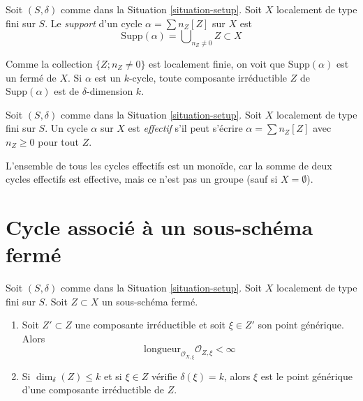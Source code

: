 \begin{definition}
\label{definition-support-cycle}
Soit $(S, \delta)$ comme dans la Situation \ref{situation-setup}.
Soit $X$ localement de type fini sur $S$.
Le {\it support} d'un cycle $\alpha = \sum n_Z [Z]$ sur $X$
est
$$
\text{Supp}(\alpha) = \bigcup\nolimits_{n_Z \not = 0} Z \subset X
$$
\end{definition}

\noindent
Comme la collection $\{Z; n_Z \not = 0\}$ est localement finie,
on voit que $\text{Supp}(\alpha)$ est un fermé de $X$.
Si $\alpha$ est un $k$-cycle, toute composante irréductible $Z$
de $\text{Supp}(\alpha)$ est de $\delta$-dimension $k$.

\begin{definition}
\label{definition-effective-cycle}
Soit $(S, \delta)$ comme dans la Situation \ref{situation-setup}.
Soit $X$ localement de type fini sur $S$.
Un cycle $\alpha$ sur $X$ est {\it effectif} s'il
peut s'écrire $\alpha =\sum n_Z [Z]$ avec $n_Z \geq 0$ pour tout $Z$.
\end{definition}

\noindent
L'ensemble de tous les cycles effectifs est un monoïde, car la somme de
deux cycles effectifs est effective, mais ce n'est pas un groupe
(sauf si $X = \emptyset$).




\section{Cycle associé à un sous-schéma fermé}
\label{section-cycle-of-closed-subscheme}

\begin{lemma}
\label{lemma-multiplicity-finite}
Soit $(S, \delta)$ comme dans la Situation \ref{situation-setup}.
Soit $X$ localement de type fini sur $S$.
Soit $Z \subset X$ un sous-schéma fermé.
\begin{enumerate}
\item Soit $Z' \subset Z$ une composante irréductible et
soit $\xi \in Z'$ son point générique.
Alors
$$
\text{longueur}_{\mathcal{O}_{X, \xi}} \mathcal{O}_{Z, \xi} < \infty
$$
\item Si $\dim_\delta(Z) \leq k$ et si $\xi \in Z$ vérifie
$\delta(\xi) = k$, alors $\xi$ est le point générique d'une
composante irréductible de $Z$.
\end{enumerate}
\end{lemma}

